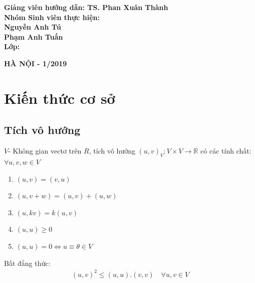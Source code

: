 \documentclass[14pt]{extreport}
\begin{document}
{\begin{center}
\end{center}
\begin{flushleft}
\vspace{1.3cm}
\hspace{1.5cm} \textbf{ Giảng viên hướng dẫn:{ TS. Phan Xuân Thành }}\\[0.2cm]
\hspace{1.5cm} \textbf{ Nhóm Sinh viên thực hiện:}\\[0.2cm]
\hspace{5cm}\textbf{Nguyễn Anh Tú}\\[0.2cm]
\hspace{5cm}\textbf{Phạm Anh Tuấn}\\[0.2cm]
\hspace{1.5cm} \textbf{ Lớp:\hspace{2cm}{ KSTN Toán Tin K60}}\\
\end{flushleft}

\begin{center}
\textbf{{\small HÀ NỘI - 1/2019}}\\
\end{center}
 }
\thispagestyle{empty}
\newpage

\tableofcontents
\newpage


\newpage
\chapter{Kiến thức cơ sở}
\section{Tích vô hướng}

$V$- Không gian vectơ trên $R$, tích vô hướng $(u,v)_V: V\times V \rightarrow \mathbb{R}$ có các tính chất: $\forall u,v,w \in V$
\begin{enumerate}
\item $(u,v)=(v,u)$ 
\item $(u,v+w)=(u,v)+(u,w)$
\item $(u, kv) = k(u,v)$
\item $(u,u)\geq 0$
\item $(u,u)=0 \Leftrightarrow  u \equiv \theta  \in V$
\end{enumerate}

Bất đẳng thức:
\begin{align*}
(u,v)^2 \leq (u,u).(v,v) \quad \forall u,v \in V
\end{align*}
\end{document}
